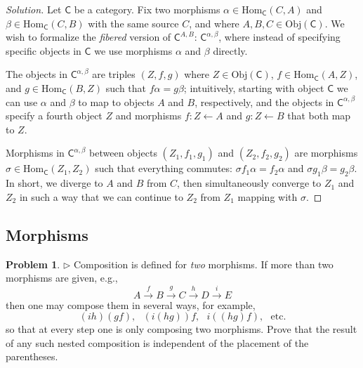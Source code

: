 \documentclass[fontsize=14pt]{scrartcl}
\theoremstyle{definition}
\newtheorem{problem-internal}{Problem}[subsection]
\newenvironment{problem}{
  \medskip
  \begin{problem-internal}
}{
  \end{problem-internal}
}
\newenvironment{solution}{
  \begin{proof}[Solution]
  \vspace{-8px}
  \setlength{\parskip}{4px}
  \setlength{\parindent}{0px}
}{
  \end{proof}
}
\newcommand{\Obj}{\mathrm{Obj}}
\newcommand{\Hom}{\mathrm{Hom}}
\newcommand{\from}{\leftarrow}
\begin{document}
\begin{solution}
\def \C {\mathsf{C}}
\def \Call {\C^{\alpha,\beta}}
\def \Cobj {\C^{A,B}}

Let $\C$ be a category. Fix two morphisms $\alpha\in\Hom_\C(C,A)$ and
$\beta\in\Hom_\C(C,B)$ with the same source $C$, and where $A,B,C\in\Obj(\C)$.
We wish to formalize the \textit{fibered} version of $\C^{A,B}$: $\Call$, where
instead of specifying specific objects in $\C$ we use morphisms $\alpha$ and
$\beta$ directly.

The objects in $\Call$ are triples $(Z,f,g)$ where $Z\in\Obj(\C)$,
$f\in\Hom_\C(A,Z)$, and $g\in\Hom_\C(B,Z)$ such that $f\alpha = g\beta$;
intuitively, starting with object $\C$ we can use $\alpha$ and $\beta$ to map to
objects $A$ and $B$, respectively, and the objects in $\Call$ specify a fourth
object $Z$ and morphisms $f:Z\from A$ and $g:Z\from B$ that both map to $Z$.

Morphisms in $\Call$ between objects $(Z_1,f_1,g_1)$ and $(Z_2,f_2,g_2)$ are
morphisms $\sigma\in\Hom_\C(Z_1,Z_2)$ such that everything commutes: $\sigma f_1
\alpha = f_2 \alpha$ and $\sigma g_1 \beta = g_2 \beta$. In short, we diverge to
$A$ and $B$ from $C$, then simultaneously converge to $Z_1$ and $Z_2$ in such a
way that we can continue to $Z_2$ from $Z_1$ mapping with $\sigma$.

\end{solution}



\subsection{Morphisms}


\begin{problem}

$\rhd$ Composition is defined for \textit{two} morphisms. If more than two
morphisms are given, e.g.,
%
\[ A \xrightarrow{f} B \xrightarrow{g} C \xrightarrow{h} D \xrightarrow{i} E \]
%
then one may compose them in several ways, for example,
%
\[ (ih)(gf),\,\,\,\,(i(hg))f,\,\,\,\,i((hg)f),\,\,\,\,\text{etc.}\]
%
so that at every step one is only composing two morphisms. Prove that the result
of any such nested composition is independent of the placement of the
parentheses.
\end{problem}
\end{document}
